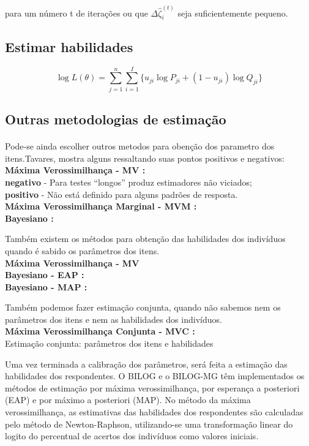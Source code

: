 	para um número t de iterações
	ou que 	$\Delta\hat{\zeta}_i^{(t)}$ seja suficientemente pequeno.
	
	
	\subsection{Estimar habilidades}
	
	\begin{equation}
	\log L(\theta) = \displaystyle\sum\limits_{j = 1}^{n}\displaystyle\sum\limits_{i = 1}^{I}\{u_{ji}\log P_{ji} + (1 - u_{ji}) \log Q_{ji}\}
    \end{equation}
	\newpage
	\subsection{Outras metodologias de estimação}
	\paragraph{}
	    Pode-se ainda escolher outros metodos para obenção dos parametro dos itens.Tavares, mostra alguns ressaltando suas pontos positivos e negativos:\\
    	\textbf{Máxima Verossimilhança - MV :}\\
    	\textbf{negativo} - Para testes “longos” produz estimadores não viciados;\\
    	\textbf{positivo} - Não está definido para alguns padrões de resposta.\\
	    \textbf{Máxima Verossimilhança Marginal - MVM :}\\
	    \textbf{Bayesiano :}\\
	\par
	    Também existem os métodos para obtenção das habilidades dos indivíduos quando é sabido os parâmetros dos itens.\\
	    \textbf{Máxima Verossimilhança - MV}\\
	    \textbf{Bayesiano - EAP :}\\
	    \textbf{Bayesiano - MAP :}\\
	\par
	    Também podemos fazer estimação conjunta, quando  não sabemos nem os parâmetros dos itens e nem as habilidades dos indivíduos.\\
	    \textbf{Máxima Verossimilhança Conjunta - MVC :}\\
	
	Estimação conjunta: parâmetros dos itens e habilidades
	
	Uma vez terminada a calibração dos parâmetros, será feita a estimação
	das habilidades dos respondentes. O BILOG e o BILOG-MG têm implementados
	os métodos de estimação por máxima verossimilhança, por esperança a
	posteriori (EAP) e por máximo a posteriori (MAP). No método da máxima
	verossimilhança, as estimativas das habilidades dos respondentes são calculadas
	pelo método de Newton-Raphson, utilizando-se uma transformação linear
	do logito do percentual de acertos dos indivíduos como valores iniciais.
	
